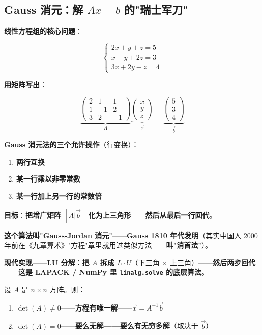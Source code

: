 \subsection{Gauss 消元：解 $Ax = b$ 的"瑞士军刀"}

\textbf{线性方程组的核心问题}：

\[
\begin{cases}
2x + y + z = 5 \\
x - y + 2z = 3 \\
3x + 2y - z = 4
\end{cases}
\]

\textbf{用矩阵写出}：

\[
\underbrace{\begin{pmatrix} 2 & 1 & 1 \\ 1 & -1 & 2 \\ 3 & 2 & -1 \end{pmatrix}}_{A}
\underbrace{\begin{pmatrix} x \\ y \\ z \end{pmatrix}}_{\vec{x}}
=
\underbrace{\begin{pmatrix} 5 \\ 3 \\ 4 \end{pmatrix}}_{\vec{b}}
\]

\textbf{Gauss 消元法的三个允许操作}（行变换）：

\begin{enumerate}
\item \textbf{两行互换}
\item \textbf{某一行乘以非零常数}
\item \textbf{某一行加上另一行的常数倍}
\end{enumerate}

\textbf{目标}：\textbf{把增广矩阵 $[A | \vec{b}]$ 化为上三角形}——\textbf{然后从最后一行回代}。

\textbf{这个算法叫"Gauss-Jordan 消元"}——\textbf{Gauss 1810 年代发明}（其实中国人 2000 年前在《九章算术》"方程"章里就用过类似方法——\textbf{叫"消首法"}）。

\textbf{现代实现}——\textbf{LU 分解}：\textbf{把 $A$ 拆成 $L \cdot U$}（下三角 × 上三角）——\textbf{然后两步回代}——\textbf{这是 LAPACK / NumPy 里 \texttt{linalg.solve} 的底层算法}。

\begin{theorem}[$Ax = b$ 的解结构]
设 $A$ 是 $n \times n$ 方阵。则：
\begin{enumerate}
\item \textbf{$\det(A) \ne 0$}——\textbf{方程有唯一解}——\textbf{$\vec{x} = A^{-1} \vec{b}$}
\item \textbf{$\det(A) = 0$}——\textbf{要么无解——要么有无穷多解}（取决于 $\vec{b}$）
\end{enumerate}
\end{theorem}

